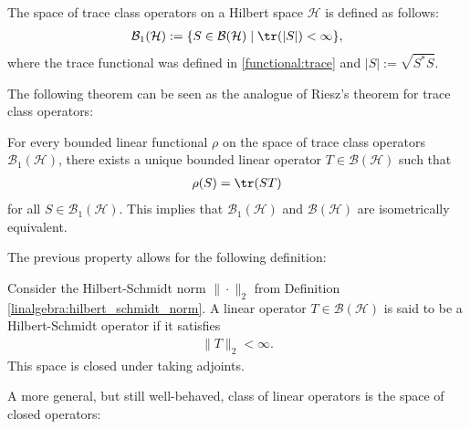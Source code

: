     \begin{example}
        The space of trace class operators on a Hilbert space $\mathcal{H}$ is defined as follows:
        \begin{gather}
            \mathcal{B}_1(\mathcal{H}) := \{S\in\mathcal{B}(\mathcal{H})\mid\tr(|S|)<\infty\},
        \end{gather}
        where the trace functional was defined in \ref{functional:trace} and $|S|:=\sqrt{S^*S}$.
    \end{example}
    The following theorem can be seen as the analogue of Riesz's theorem for trace class operators:
    \begin{property}
        For every bounded linear functional $\rho$ on the space of trace class operators $\mathcal{B}_1(\mathcal{H})$, there exists a unique bounded linear operator $T\in\mathcal{B}(\mathcal{H})$ such that
        \begin{gather}
            \rho(S) = \tr(ST)
        \end{gather}
        for all $S\in\mathcal{B}_1(\mathcal{H})$. This implies that $\mathcal{B}_1(\mathcal{H})$ and $\mathcal{B}(\mathcal{H})$ are isometrically equivalent.
    \end{property}

    The previous property allows for the following definition:

    \begin{example}\label{functional:hilbert_schmidt}
        Consider the Hilbert-Schmidt norm $\|\cdot\|_2$ from Definition \ref{linalgebra:hilbert_schmidt_norm}. A linear operator $T\in\mathcal{B}(\mathcal{H})$ is said to be a Hilbert-Schmidt operator if it satisfies
        \begin{gather}
            \|T\|_2<\infty.
        \end{gather}
        This space is closed under taking adjoints.
    \end{example}

    A more general, but still well-behaved, class of linear operators is the space of closed operators:

